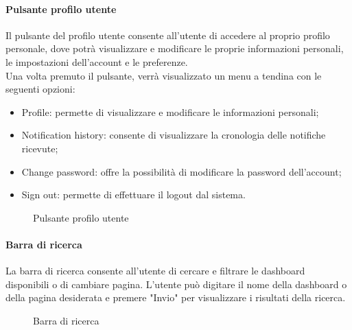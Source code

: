 \paragraph{Pulsante profilo utente}
Il pulsante del profilo utente consente all'utente di accedere al proprio profilo personale, dove potrà visualizzare e modificare le proprie informazioni personali, le impostazioni dell'account e le preferenze.\\
Una volta premuto il pulsante, verrà visualizzato un menu a tendina con le seguenti opzioni:
\begin{itemize}
    \item Profile: permette di visualizzare e modificare le informazioni personali;
    \item Notification history: consente di visualizzare la cronologia delle notifiche ricevute;
    \item Change password: offre la possibilità di modificare la password dell'account;
    \item Sign out: permette di effettuare il logout dal sistema.
\end{itemize}
\begin{figure}[H]
    \centering
    \caption{Pulsante profilo utente}
    \label{fig:my_label}
\end{figure}


\paragraph{Barra di ricerca}
La barra di ricerca consente all'utente di cercare e filtrare le dashboard disponibili o di cambiare pagina. L'utente può digitare il nome della dashboard o della pagina desiderata e premere "Invio" per visualizzare i risultati della ricerca.
\begin{figure}[H]
    \centering
    \caption{Barra di ricerca}
    \label{fig:my_label}
\end{figure}

